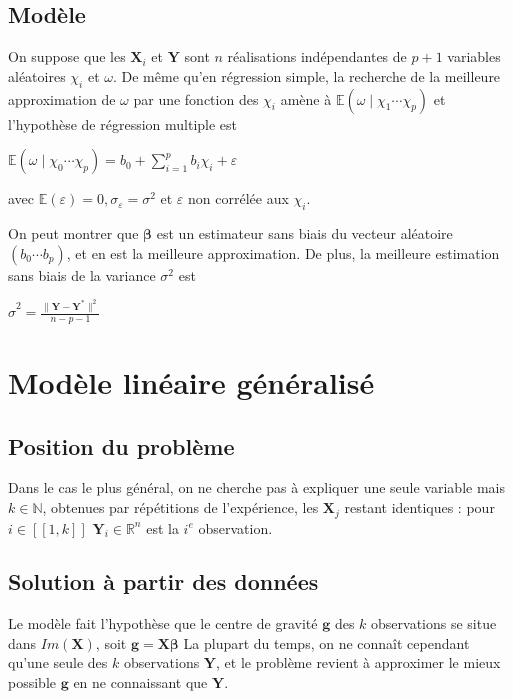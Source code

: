\documentclass[letterpaper,10pt,french]{sphinxmanual}
\begin{document}
\subsection{Modèle}
\label{\detokenize{regression:modele}}
\sphinxAtStartPar
On suppose que les \(\mathbf X_i\) et \(\mathbf Y\) sont \(n\) réalisations indépendantes de \(p+1\) variables aléatoires \(\chi_i\) et \(\omega\). De même qu’en régression simple, la recherche de la meilleure approximation de \(\omega\) par une fonction des \(\chi_i\) amène à \(\mathbb{E}(\omega\mid \chi_1\cdots \chi_p)\) et l’hypothèse de régression multiple est

\sphinxAtStartPar
\(\mathbb{E}(\omega\mid \chi_0\cdots \chi_p) = b_0+\displaystyle\sum_{i=1}^p b_i\chi_i+\varepsilon\)

\sphinxAtStartPar
avec \(\mathbb{E}(\varepsilon)=0, \sigma_\varepsilon=\sigma^2\) et \(\varepsilon\) non corrélée aux \(\chi_i\).

\sphinxAtStartPar
On peut montrer que \(\boldsymbol\beta\) est un estimateur sans biais du vecteur aléatoire  \((b_0\cdots b_p)\), et en est la meilleure approximation. De plus, la meilleure estimation sans biais de la variance \(\sigma^2\) est

\sphinxAtStartPar
\(\hat{\sigma}^2 = \frac{\|\mathbf Y -\mathbf Y^*\|^2}{n-p-1}\)


\section{Modèle linéaire généralisé}
\label{\detokenize{regression:modele-lineaire-generalise}}

\subsection{Position du problème}
\label{\detokenize{regression:position-du-probleme}}
\sphinxAtStartPar
Dans le cas le plus général, on ne cherche pas à expliquer une seule variable mais \(k\in\mathbb{N}\), obtenues par répétitions de l’expérience, les \(\mathbf X_j\) restant identiques : pour \(i\in[\![1,k]\!]\) \(\mathbf{Y}_i\in\mathbb{R}^n\) est la \(i^e\) observation.


\subsection{Solution à partir des données}
\label{\detokenize{regression:solution-a-partir-des-donnees}}
\sphinxAtStartPar
Le modèle fait l’hypothèse que le centre de gravité \(\mathbf g\) des \(k\) observations se situe dans \(Im(\mathbf X)\), soit \(\mathbf g = \mathbf X \boldsymbol \beta\)
La plupart du temps, on ne connaît cependant qu’une seule des \(k\) observations \(\mathbf Y\), et le problème revient à approximer le mieux possible \(\mathbf g\) en ne connaissant que \(\mathbf Y\).
\end{document}
